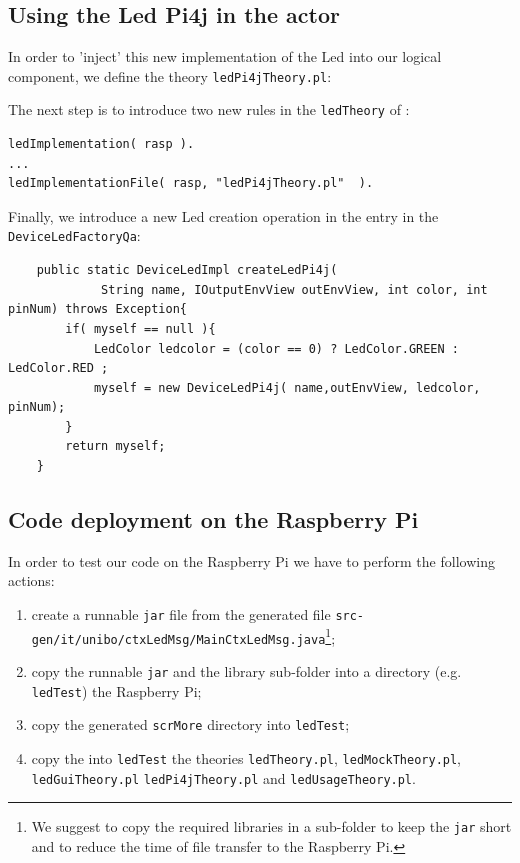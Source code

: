 \subsection{Using the Led Pi4j in the actor}
In order to 'inject' this new implementation of the Led into our logical component, we define the theory \texttt{ledPi4jTheory.pl}:



The next step is to introduce two new rules in  the \texttt{ledTheory} of :

\begin{lstlisting}
ledImplementation( rasp ).
...
ledImplementationFile( rasp, "ledPi4jTheory.pl"  ).
\end{lstlisting}

Finally, we introduce a new Led creation operation in the entry in the \texttt{DeviceLedFactoryQa}:
\begin{lstlisting}
    public static DeviceLedImpl createLedPi4j( 
    		 String name, IOutputEnvView outEnvView, int color, int pinNum) throws Exception{
      	if( myself == null ){
    		LedColor ledcolor = (color == 0) ? LedColor.GREEN : LedColor.RED ;
  	  		myself = new DeviceLedPi4j( name,outEnvView, ledcolor, pinNum);  			 
   		}
   	    return myself;
    }
\end{lstlisting}

\subsection{Code deployment on the Raspberry Pi}
In order to test our code on the Raspberry Pi we have to perform the following actions:
\begin{enumerate}
\item create a runnable \texttt{jar} file from the generated file \texttt{src-gen/it/unibo/ctxLedMsg/MainCtxLedMsg.java}\footnote{We suggest to copy the required libraries in a sub-folder to keep the \texttt{jar} short and to reduce the time of file transfer to the Raspberry Pi.};
\item copy the runnable \texttt{jar} and the library sub-folder into a directory (e.g. \texttt{ledTest}) the Raspberry Pi;
\item copy the generated \texttt{scrMore} directory into \texttt{ledTest};
\item copy the into \texttt{ledTest} the theories  \texttt{ledTheory.pl}, \texttt{ledMockTheory.pl}, \texttt{ledGuiTheory.pl} \texttt{ledPi4jTheory.pl} and \texttt{ledUsageTheory.pl}.
\end{enumerate}

